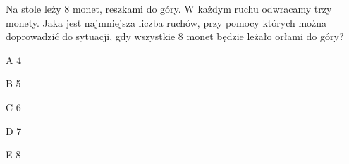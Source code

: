 \begin{tresc}
Na stole leży 8 monet, reszkami do góry. W każdym ruchu odwracamy trzy monety. Jaka jest najmniejsza liczba ruchów, przy pomocy których można doprowadzić do sytuacji, gdy wszystkie 8 monet będzie leżało orłami do góry?
\end{tresc}
\begin{wariant}{A} 4 \end{wariant}
\begin{wariant}{B} 5 \end{wariant}
\begin{wariant}{C} 6 \end{wariant}
\begin{wariant}{D} 7 \end{wariant}
\begin{wariant}{E} 8 \end{wariant}
